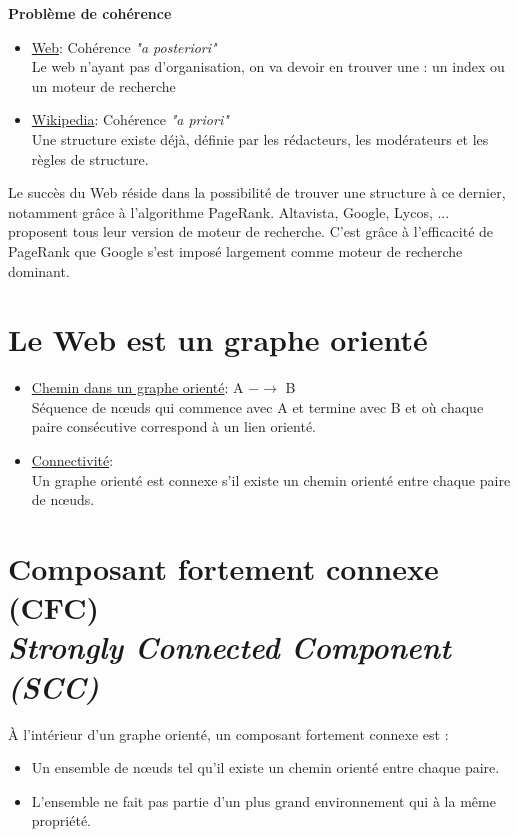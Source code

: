 \textbf{Problème de cohérence}

\begin{itemize}
\item \underline{Web}: Cohérence \textit{"a posteriori"} 
						\vspace{0.1cm}
                       \\ Le web n'ayant pas d'organisation, on va devoir en trouver une : un index ou un moteur de recherche
      
\item \underline{Wikipedia}: Cohérence \textit{"a priori"}
							\vspace{0.1cm}
                             \\ Une structure existe déjà, définie par les rédacteurs, les modérateurs et les règles de structure.
\end{itemize}

Le succès du Web réside dans la possibilité de trouver une structure à ce dernier, notamment grâce à l'algorithme PageRank. Altavista, Google, Lycos, ... proposent tous leur version de moteur de recherche. C'est grâce à l'efficacité de PageRank que Google s'est imposé largement comme moteur de recherche dominant.

\section{Le Web est un graphe orienté}
\begin{itemize}
\item \underline{Chemin dans un graphe orienté}: A $- \rightarrow$ B
\vspace{0.1cm}
\\Séquence de nœuds qui commence avec A et termine avec B et où chaque paire consécutive correspond à un lien orienté.

\item \underline{Connectivité}: 
\vspace{0.1cm}
\\Un graphe orienté est connexe s'il existe un chemin orienté entre chaque paire de nœuds.
\end{itemize}

\section{Composant fortement connexe (CFC) \\ \textit{Strongly Connected Component (SCC)} }

À l'intérieur d'un graphe orienté, un composant fortement connexe est :
\begin{itemize}
    \item Un ensemble de nœuds tel qu'il existe un chemin orienté entre chaque paire.
    \item L'ensemble ne fait pas partie d'un plus grand environnement qui à la même propriété. 
\end{itemize}

